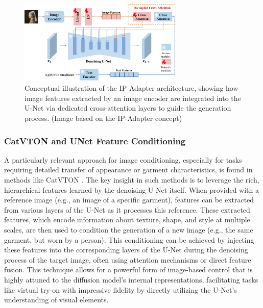 \begin{figure}[h]
  \centering
  \includegraphics[width=0.7\textwidth]{images/related-work/ipadapter.png}
  \caption{Conceptual illustration of the IP-Adapter architecture, showing how image features extracted by an image encoder are integrated into the U-Net via dedicated cross-attention layers to guide the generation process. (Image based on the IP-Adapter concept)}
  \label{fig:ipadapter-concept}
\end{figure}

\subsubsection{CatVTON and UNet Feature Conditioning}
A particularly relevant approach for image conditioning, especially for tasks requiring detailed transfer of appearance or garment characteristics, is found in methods like CatVTON \cite{catvton}. The key insight in such methods is to leverage the rich, hierarchical features learned by the denoising U-Net itself. When provided with a reference image (e.g., an image of a specific garment), features can be extracted from various layers of the U-Net as it processes this reference. These extracted features, which encode information about texture, shape, and style at multiple scales, are then used to condition the generation of a new image (e.g., the same garment, but worn by a person). This conditioning can be achieved by injecting these features into the corresponding layers of the U-Net during the denoising process of the target image, often using attention mechanisms or direct feature fusion. This technique allows for a powerful form of image-based control that is highly attuned to the diffusion model's internal representations, facilitating tasks like virtual try-on with impressive fidelity by directly utilizing the U-Net's understanding of visual elements.

